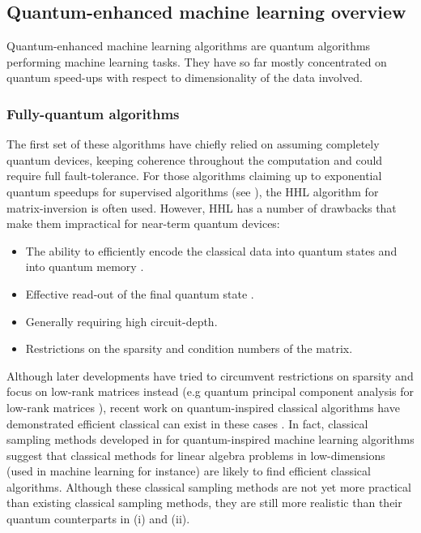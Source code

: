 \documentclass[twocolumn, aps, rmp, amsmath, amssymb, nofootinbib, superscriptaddress, longbibliography, floatfix, table-of-contents, eqsecnum]{revtex4-2}
\begin{document}
\subsection{Quantum-enhanced machine learning overview}
Quantum-enhanced machine learning algorithms are quantum algorithms performing machine learning tasks. They have so far mostly concentrated on quantum speed-ups with respect to dimensionality of the data involved. \\

\subsubsection{Fully-quantum algorithms}

The first set of these algorithms have chiefly relied on assuming completely quantum devices, keeping coherence throughout the computation and could require full fault-tolerance. For those algorithms claiming up to exponential quantum speedups for supervised algorithms (see \cite{biamonte2017quantum, ciliberto2018quantum}),  the HHL algorithm \cite{harrow2009quantum} for matrix-inversion is often used. However, HHL has a number of drawbacks that make them impractical for near-term quantum devices:
\begin{itemize}
\item The ability to efficiently encode the classical data into quantum states and into quantum memory \cite{aaronson2015read}.
\item Effective read-out of the final quantum state \cite{aaronson2015read}.
\item Generally requiring high circuit-depth.
\item Restrictions on the sparsity and condition numbers of the matrix.
\end{itemize}

Although later developments have tried to circumvent restrictions on sparsity and focus on low-rank matrices instead (e.g quantum principal component analysis for low-rank matrices \cite{lloyd2014quantum}), recent work on quantum-inspired classical algorithms have demonstrated efficient classical can exist in these cases \cite{tang2018quantum, gilyen2018quantum, chia2018quantum}. In fact, classical sampling methods developed in \cite{tang2018quantum} for quantum-inspired machine learning algorithms suggest that classical methods for linear algebra problems in low-dimensions (used in machine learning for instance) are likely to find efficient classical algorithms. Although these classical sampling methods are not yet more practical than existing classical sampling methods, they are still more realistic than their quantum counterparts in (i) and (ii).
\end{document}
